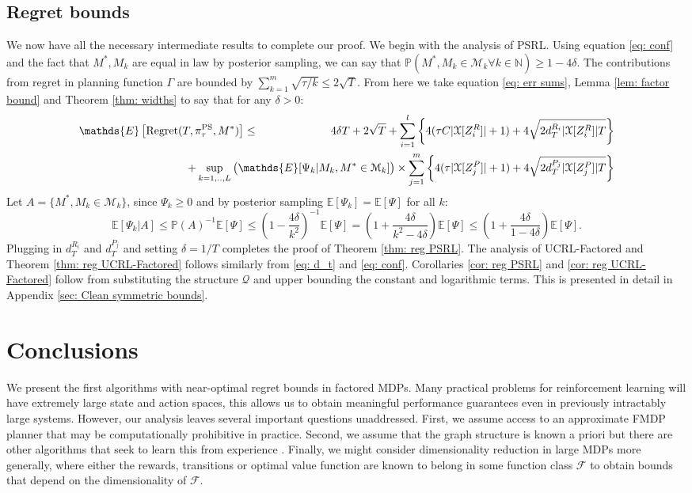 \documentclass{article}
\newcommand{\Exp}{\mathds{E}}
\newcommand{\Prob}{\mathds{P}}
\newcommand{\Nat}{\mathbb{N}}
\newcommand{\Xc}{\mathcal{X}}
\newcommand{\Qc}{\mathcal{Q}}
\newcommand{\Fc}{\mathcal{F}}
\newcommand{\Mc}{\mathcal{M}}
\begin{document}
\subsection{Regret bounds}
\label{sec: bounds}
We now have all the necessary intermediate results to complete our proof.
We begin with the analysis of PSRL.
Using equation \eqref{eq: conf} and the fact that $M^*,M_k$ are equal in law by posterior sampling, we can say that $\Prob( M^*, M_k \in \Mc_k \forall k \in \Nat) \ge 1-4\delta$.
The contributions from regret in planning function $\Gamma$ are bounded by $ \sum_{k=1}^m \sqrt{\tau/k} \le 2\sqrt{T}$.
From here we take equation \eqref{eq: err sums}, Lemma \ref{lem: factor bound} and Theorem \ref{thm: widths} to say that for any $\delta > 0 $:
\begin{eqnarray*}
	\Exp \left[\mathrm{Regret}(T, \pi^{\rm PS}_{\tau}, M^*) \right] &\le& 4\delta T +2 \sqrt{T} +
		\sum_{i=1}^l \left\{ 4(\tau C |\Xc[Z^R_i]| + 1) + 4\sqrt{2d_T^{R_i} | \Xc[Z^R_i]| T} \right\} \\
	&& \hspace{-25mm} + \sup_{k=1,..,L} \big( \Exp[\Psi_k | M_k, M^* \in \Mc_k] \big) \times \sum_{j=1}^m \left\{ 4(\tau |\Xc[Z^P_j]| + 1) + 4\sqrt{2d_T^{P_j} | \Xc[Z^P_j]| T} \right\}
\end{eqnarray*}
Let $A = \{ M^*, M_k \in \Mc_k \}$, since $\Psi_k \ge 0$ and by posterior sampling $\Exp [ \Psi_k ] = \Exp [\Psi]$ for all $k$:
$$\Exp[ \Psi_k \vert A  ] \le \Prob(A)^{-1} \Exp[\Psi] \le \left( 1 - \frac{4 \delta}{k^2} \right)^{-1} \Exp[ \Psi ] = \left(1 + \frac{4\delta}{k^2 - 4\delta} \right) \Exp[ \Psi ] \le \left(1 + \frac{4\delta}{1 - 4\delta} \right) \Exp[ \Psi ].$$
Plugging in $d_T^{R_i}$ and $d_T^{P_j}$ and setting $\delta=1/T$ completes the proof of Theorem \ref{thm: reg PSRL}.
The analysis of UCRL-Factored and Theorem \ref{thm: reg UCRL-Factored} follows similarly from \eqref{eq: d_t} and \eqref{eq: conf}.
Corollaries \ref{cor: reg PSRL} and \ref{cor: reg UCRL-Factored} follow from substituting the structure $\Qc$ and upper bounding the constant and logarithmic terms.
This is presented in detail in Appendix \ref{sec: Clean symmetric bounds}.

\section{Conclusions}
We present the first algorithms with near-optimal regret bounds in factored MDPs.
Many practical problems for reinforcement learning will have extremely large state and action spaces, this allows us to obtain meaningful performance guarantees even in previously intractably large systems.
However, our analysis leaves several important questions unaddressed.
First, we assume access to an approximate FMDP planner that may be computationally prohibitive in practice.
Second, we assume that the graph structure is known a priori but there are other algorithms that seek to learn this from experience \cite{strehl2007efficient,diuk2009adaptive}.
Finally, we might consider dimensionality reduction in large MDPs more generally, where either the rewards, transitions or optimal value function are known to belong in some function class $\Fc$ to obtain bounds that depend on the dimensionality of $\Fc$.
\end{document}
